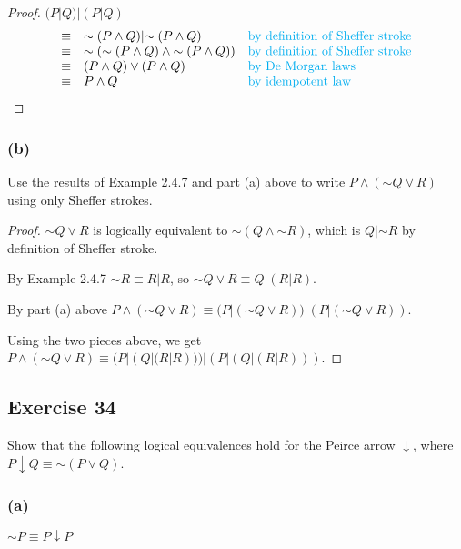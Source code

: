 \documentclass[14pt]{extarticle}
\newcommand{\da}{\downarrow}
\begin{document}
\begin{proof}
    $(P | Q) | (P | Q)$
    $$
        \begin{array}{cll}
            \equiv & {\sim (P \wedge Q)} | {\sim (P \wedge Q)}               & \text{\color{cyan}by definition of Sheffer stroke} \\
            \equiv & {\sim ({\sim (P \wedge Q)} \wedge {\sim (P \wedge Q)})} & \text{\color{cyan}by definition of Sheffer stroke} \\
            \equiv & (P \wedge Q) \vee (P \wedge Q)                          & \text{\color{cyan}by De Morgan laws}               \\
            \equiv & P \wedge Q                                              & \text{\color{cyan}by idempotent law}               \\\end{array}
    $$
\end{proof}

\subsubsection{(b)}
Use the results of Example 2.4.7 and part (a) above to write $P \wedge ({\sim Q} \vee R)$ using only Sheffer strokes.

\begin{proof}
    ${\sim Q} \vee R$ is logically equivalent to ${\sim (Q \wedge
                {\sim R})}$, which is $Q | {\sim R}$ by definition of Sheffer stroke.

    By Example 2.4.7 ${\sim R} \equiv R | R$, so ${\sim Q} \vee R \equiv Q | (R | R)$.

    By part (a) above $P \wedge ({\sim Q} \vee R) \equiv (P|({\sim Q} \vee R)) | (P|({\sim Q} \vee R))$.

    Using the two pieces above, we get $P \wedge ({\sim Q} \vee R) \equiv (P|(Q | (R | R))) | (P|(Q | (R | R)))$.
\end{proof}

\subsection{Exercise 34}
Show that the following logical equivalences hold for the Peirce arrow $\da$, where $P \da Q \equiv {\sim (P \vee Q)}$.

\subsubsection{(a)}
${\sim P} \equiv P \da P$
\end{document}
